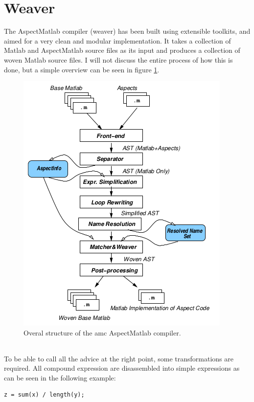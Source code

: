 \documentclass[a4paper]{report}
\begin{document}
\section{Weaver}
The AspectMatlab compiler (weaver) has been built using extensible toolkits, and aimed for a very clean and modular implementation. It takes a collection of Matlab and AspectMatlab source files as its input and produces a collection of woven Matlab source files. I will not discuss the entire process of how this is done, but a simple overview can be seen in figure \ref{fig:Matlab_Weaver}.\\
\begin{figure}[h!]
\centering
\includegraphics[scale=0.5]{images/Languages/Matlab_Weaver.png}
\caption{Overal structure of the amc AspectMatlab compiler. \citep{aslam_aspectmatlab:_2010}}
\label{fig:Matlab_Weaver}
\end{figure}
\\
To be able to call all the advice at the right point, some transformations are required. All compound expression are disassembled into simple expressions as can be seen in the following example:\\
\begin{minipage}{0.45\textwidth}
\begin{lstlisting}[caption=Original code.]
z = sum(x) / length(y);
\end{lstlisting}
\end{minipage}\hfill
\end{document}
